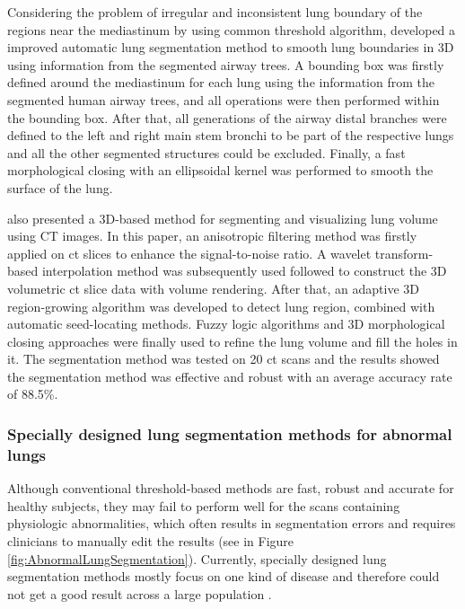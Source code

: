 Considering the problem of irregular and inconsistent lung boundary of the regions near the mediastinum by using common threshold algorithm, \cite{ukil2005smoothing} developed a improved automatic lung segmentation method to smooth lung boundaries in 3D using information from the segmented airway trees. A bounding box was firstly defined around the mediastinum for each lung using the information from the segmented human airway trees, and all operations were then performed within the bounding box. After that, all generations of the airway distal branches were defined to the left and right main stem bronchi to be part of the respective lungs and all the other segmented structures could be excluded. Finally, a fast morphological closing with an ellipsoidal kernel was performed to smooth the surface of the lung. 

\cite{sun20063d} also presented a 3D-based method for segmenting and visualizing lung volume using CT images. In this paper, an anisotropic filtering method was firstly applied on \gls{ct} slices to enhance the signal-to-noise ratio. A wavelet transform-based interpolation method was subsequently used followed to construct the 3D volumetric \gls{ct} slice data with volume rendering. After that, an adaptive 3D region-growing algorithm was developed to detect lung region, combined with automatic seed-locating methods. Fuzzy logic algorithms and 3D morphological closing approaches were finally used to refine the lung volume and fill the holes in it. The segmentation method was tested on 20 \gls{ct} scans and the results showed the segmentation method was effective and robust with an average accuracy rate of 88.5\%.  

\subsubsection{Specially designed lung segmentation methods for abnormal lungs}
Although conventional threshold-based methods are fast, robust and accurate for healthy subjects, they may fail to perform well for the scans containing physiologic abnormalities, which often results in segmentation errors and requires clinicians to manually edit the results (see in Figure \ref{fig:AbnormalLungSegmentation}). Currently, specially designed lung segmentation methods mostly focus on one kind of disease and therefore could not get a good result across a large population \citep{kitasaka2003lung,sluimer2005toward,pu2008adaptive,pu2011shape,prasad2008automatic,korfiatis2008texture,wang2009automated,van2009automatic,sun2012automated}. 


